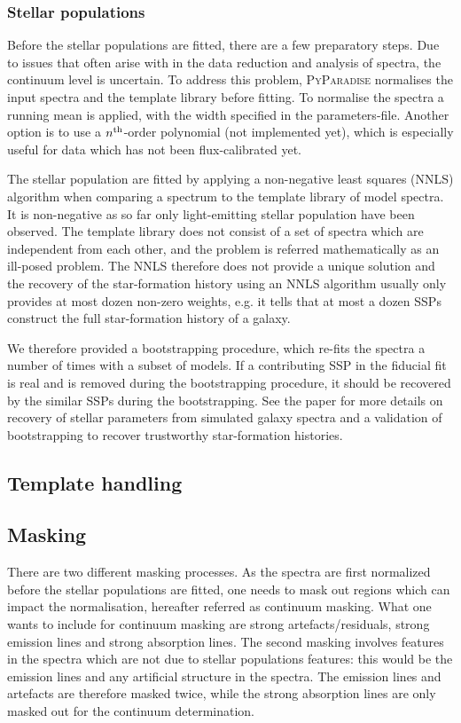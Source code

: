 \documentclass[usenatbib,usegraphicx,useAMS,onecolumn]{mn2e}
\begin{document}
\subsubsection{Stellar populations}
\label{subsec:ssp_ssp}
Before the stellar populations are fitted, there are a few preparatory steps.
Due to issues that often arise with in the data reduction and analysis of spectra, the continuum level is uncertain.
To address this problem, \textsc{PyParadise} normalises the input spectra and the template library before fitting.
To normalise the spectra a running mean is applied, with the width specified in the parameters-file.
Another option is to use a $n^{\rm th}$-order polynomial (not implemented yet), which is especially useful for data which has not been flux-calibrated yet.

The stellar population are fitted by applying a non-negative least squares (NNLS) algorithm when comparing a spectrum to the template library of model spectra.
It is non-negative as so far only light-emitting stellar population have been observed.
The template library does not consist of a set of spectra which are independent from each other, and the problem is referred mathematically as an ill-posed problem.
The NNLS therefore does not provide a unique solution and the recovery of the star-formation history using an NNLS algorithm usually only provides at most dozen non-zero weights, e.g. it tells that at most a dozen SSPs construct the full star-formation history of a galaxy.

We therefore provided a bootstrapping procedure, which re-fits the spectra a number of times with a subset of models.
If a contributing SSP in the fiducial fit is real and is removed during the bootstrapping procedure, it should be recovered by the similar SSPs during the bootstrapping.
See the paper for more details on recovery of stellar parameters from simulated galaxy spectra and a validation of bootstrapping to recover trustworthy star-formation histories.

\subsection{Template handling}
\label{subsec:ssp_template}
\subsection{Masking}
\label{subsec:ssp_mask}
There are two different masking processes.
As the spectra are first normalized before the stellar populations are fitted, one needs to mask out regions which can impact the normalisation, hereafter referred as continuum masking.
What one wants to include for continuum masking are strong artefacts/residuals, strong emission lines and strong absorption lines.
The second masking involves features in the spectra which are not due to stellar populations features: this would be the emission lines and any artificial structure in the spectra.
The emission lines and artefacts are therefore masked twice, while the strong absorption lines are only masked out for the continuum determination.
\end{document}
